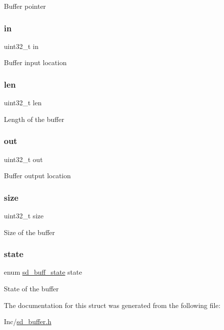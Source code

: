 Buffer pointer \mbox{\label{structsd__cbuf_a86fd6c417fa43c58339f7cde29495419}} 
\subsubsection{\texorpdfstring{in}{in}}
{\footnotesize\ttfamily uint32\+\_\+t in}

Buffer input location \mbox{\label{structsd__cbuf_a96bbf959016e4411c9e6b9812a8be60a}} 
\subsubsection{\texorpdfstring{len}{len}}
{\footnotesize\ttfamily uint32\+\_\+t len}

Length of the buffer \mbox{\label{structsd__cbuf_ab27775f0ed2b042b439a7431fbe311eb}} 
\subsubsection{\texorpdfstring{out}{out}}
{\footnotesize\ttfamily uint32\+\_\+t out}

Buffer output location \mbox{\label{structsd__cbuf_ab2c6b258f02add8fdf4cfc7c371dd772}} 
\subsubsection{\texorpdfstring{size}{size}}
{\footnotesize\ttfamily uint32\+\_\+t size}

Size of the buffer \mbox{\label{structsd__cbuf_aa88ff4ca3b7aaba9e9aaa27fd9ea94a9}} 
\subsubsection{\texorpdfstring{state}{state}}
{\footnotesize\ttfamily enum \mbox{\hyperlink{group___s_d___buffer___types_ga52f14e9c7b7d9ba092e1cd615559012b}{sd\+\_\+buff\+\_\+state}} state}

State of the buffer 

The documentation for this struct was generated from the following file\+:\begin{DoxyCompactItemize}
\item 
Inc/\mbox{\hyperlink{sd__buffer_8h}{sd\+\_\+buffer.\+h}}\end{DoxyCompactItemize}
